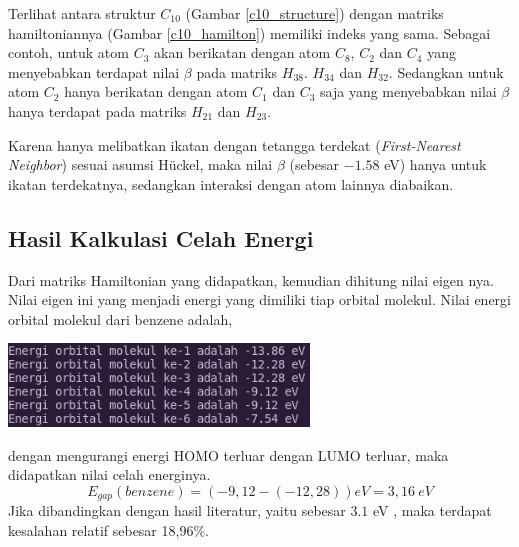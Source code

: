 \documentclass[12pt,a4paper]{report}
\begin{document}
Terlihat antara struktur $C_{10}$ (Gambar \ref{c10_structure}) dengan matriks hamiltoniannya (Gambar \ref{c10_hamilton}) memiliki indeks yang sama. Sebagai contoh, untuk atom $C_{3}$ akan berikatan dengan atom $C_{8}$, $C_{2}$ dan $C_{4}$ yang menyebabkan terdapat nilai $\beta$ pada matriks $H_{38}$. $H_{34}$ dan $H_{32}$. Sedangkan untuk atom $C_{2}$ hanya berikatan dengan atom $C_{1}$ dan $C_{3}$ saja yang menyebabkan nilai $\beta$ hanya terdapat pada matriks $H_{21}$ dan $H_{23}$.

Karena hanya melibatkan ikatan dengan tetangga terdekat (\textit{First-Nearest Neighbor}) sesuai asumsi Hückel, maka nilai $\beta$ (sebesar $-1.58$ eV) hanya untuk ikatan terdekatnya, sedangkan interaksi dengan atom lainnya diabaikan.

\subsection{Hasil Kalkulasi Celah Energi}

Dari matriks Hamiltonian yang didapatkan, kemudian dihitung nilai eigen nya. Nilai eigen ini yang menjadi energi yang dimiliki tiap orbital molekul. Nilai energi orbital molekul dari benzene adalah,
\begin{center}
	\includegraphics[width=8cm]{gambar/benzene-energy.png}
	\label{benzene_energy}
\end{center}
dengan mengurangi energi HOMO terluar dengan LUMO terluar, maka didapatkan nilai celah energinya.
\begin{equation}
E_{gap} (benzene) = (-9,12 - (-12,28)) eV = 3,16 \ eV
\end{equation}
Jika dibandingkan dengan hasil literatur, yaitu sebesar $3.1$ eV \cite{Masiak2017}, maka terdapat kesalahan relatif sebesar 18,96\%.
\end{document}
